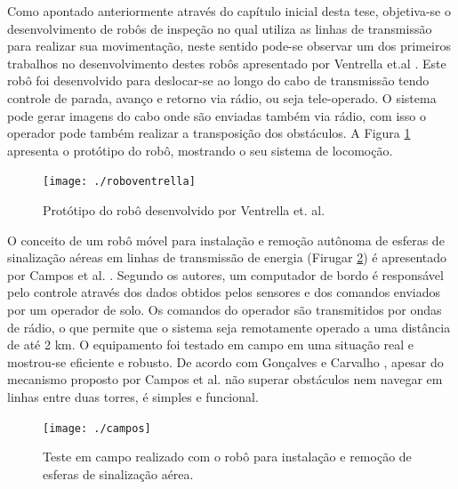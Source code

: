 Como apontado anteriormente através do capítulo inicial desta tese, objetiva-se o desenvolvimento de robôs de inspeção no qual utiliza as linhas de transmissão para realizar sua movimentação, neste sentido pode-se observar um dos primeiros trabalhos no desenvolvimento destes robôs apresentado por Ventrella et.al \cite{ventrella2003robo}. Este robô foi desenvolvido para deslocar-se ao longo do cabo de transmissão tendo controle de parada, avanço e retorno via rádio, ou seja tele-operado. O sistema pode gerar imagens do cabo onde são enviadas também via rádio, com isso o operador pode também realizar a transposição dos obstáculos. A Figura \ref{img:roboventrella} apresenta o protótipo do robô, mostrando o seu sistema de locomoção.

\begin{figure} [h!]	
	\caption{Protótipo do robô desenvolvido por Ventrella et. al.}
	\label{img:roboventrella}											 
	\centering													 
	\texttt{[image: ./roboventrella]}
\end{figure}													 

O conceito de um robô móvel para instalação e remoção autônoma de esferas de sinalização aéreas em linhas de transmissão de energia (Firugar \ref{img:campos}) é apresentado por Campos et al. \cite{campos2002mobile}. Segundo os autores, um computador de bordo é responsável pelo controle através dos dados obtidos pelos sensores e dos comandos enviados por um operador de solo. Os comandos do operador são transmitidos por ondas de rádio, o que permite que o sistema seja remotamente operado a uma distância de até 2 km. O equipamento foi testado em campo em uma situação real e mostrou-se eficiente e robusto. De acordo com Gonçalves e Carvalho \cite{gonccalves2013review}, apesar do mecanismo proposto por Campos et al. \cite{campos2002mobile} não superar obstáculos nem navegar em linhas entre duas torres, é simples e funcional.

\begin{figure} [h!]	
	\caption{Teste em campo realizado com o robô para instalação e remoção de esferas de sinalização aérea.}
	\label{img:campos}											 
	\centering													 
	\texttt{[image: ./campos]}
\end{figure}													 

